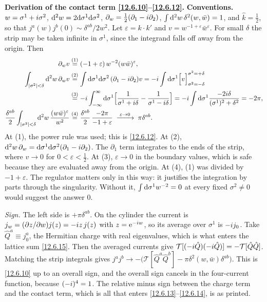 \begin{tcolorbox}[breakable]
	\begin{remark}
		\textbf{Derivation of the contact term \eqref{12.6.10}--\eqref{12.6.12}.} \textbf{Conventions.} $w=\sigma^{1}+i\sigma^{2}$, $\mathrm{d}^{2}w=2\mathrm{d}\sigma^{1}\mathrm{d}\sigma^{2}$, $\partial_{w}=\frac12(\partial_{1}-i\partial_{2})$, $\int\mathrm{d}^{2}w\,\delta^{2}(w,\bar w)=1$, and $\hat k=\frac12$, so that $j^{a}(w)j^{b}(0)\sim\delta^{ab}/2w^{2}$. Let $\varepsilon=k\cdot k'$ and $v=w^{-1+\varepsilon}\bar w^{\varepsilon}$. For small $\delta$ the strip may be taken infinite in $\sigma^{1}$, since the integrand falls off away from the origin. Then
		\begin{align*}
			\partial_{w}v&\overset{(1)}{=} (-1+\varepsilon)\,w^{-2}(w\bar w)^{\varepsilon} ,\\
			\int_{|\sigma^{2}|<\delta}\mathrm{d}^{2}w\,\partial_{w}v
			&\overset{(2)}{=} \int\mathrm{d}\sigma^{1}\mathrm{d}\sigma^{2}\,(\partial_{1}-i\partial_{2})v
			=-i\int\mathrm{d}\sigma^{1}\Bigl[v\Bigr]_{\sigma^{2}=-\delta}^{\sigma^{2}=+\delta}\\
			&\overset{(3)}{=} -i\int_{-\infty}^{\infty}\mathrm{d}\sigma^{1}\Bigl[\frac{1}{\sigma^{1}+i\delta}-\frac{1}{\sigma^{1}-i\delta}\Bigr]
			=-i\int\mathrm{d}\sigma^{1}\frac{-2i\delta}{(\sigma^{1})^{2}+\delta^{2}}=-2\pi ,\\
			\frac{\delta^{ab}}{2}\int_{|\sigma^{2}|<\delta}\mathrm{d}^{2}w\,\frac{(w\bar w)^{\varepsilon}}{w^{2}}
			&\overset{(4)}{=} \frac{\delta^{ab}}{2}\,\frac{-2\pi}{-1+\varepsilon}\;\xrightarrow{\;\varepsilon\to0\;}\;\pi\delta^{ab} .
		\end{align*}
		At (1), the power rule was used; this is \eqref{12.6.12}. At (2), $\mathrm{d}^{2}w\,\partial_{w}=\mathrm{d}\sigma^{1}\mathrm{d}\sigma^{2}(\partial_{1}-i\partial_{2})$. The $\partial_{1}$ term integrates to the ends of the strip, where $v\to0$ for $0<\varepsilon<\frac12$. At (3), $\varepsilon\to0$ in the boundary values, which is safe because they are evaluated away from the origin. At (4), (1) was divided by $-1+\varepsilon$. The regulator matters only in this way: it justifies the integration by parts through the singularity. Without it, $\int\mathrm{d}\sigma^{1}w^{-2}=0$ at every fixed $\sigma^{2}\neq0$ would suggest the answer $0$.

		\emph{Sign.} The left side is $+\pi\delta^{ab}$. On the cylinder the current is $j_{w}=(\partial z/\partial w)j(z)=-i z\,j(z)$ with $z=\mathrm{e}^{-i w}$, so its average over $\sigma^{1}$ is $-i j_{0}$. Take $\hat Q^{a}\equiv j^{a}_{0}$, the Hermitian charge with real eigenvalues, which is what enters the lattice sum \eqref{12.6.15}. Then the averaged currents give $\mathcal T[(-i\hat Q)(-i\hat Q)]=-\mathcal T[\hat Q\hat Q]$. Matching the strip integrals gives $j^{a}j^{b}\to-\bigl(\mathcal T[\hat Q^{a}\hat Q^{b}]-\pi\delta^{2}(w,\bar w)\delta^{ab}\bigr)$. This is \eqref{12.6.10} up to an overall sign, and the overall sign cancels in the four-current function, because $(-i)^{4}=1$. The relative minus sign between the charge term and the contact term, which is all that enters \eqref{12.6.13}--\eqref{12.6.14}, is as printed.
	\end{remark}
\end{tcolorbox}

